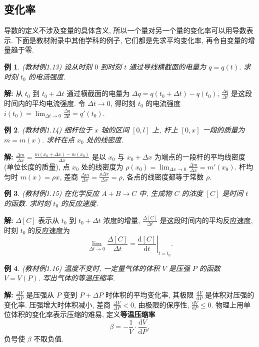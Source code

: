 \documentclass[UTF8,openany]{ctexbook}
\theoremstyle{chinesetextbook}
\newtheorem{example}{例}[section]
\newenvironment{cnsolution}{\par\indent\textbf{解:} \ignorespaces}{\par}
\newcommand{\dd}{\mathrm d}
\begin{document}
\subsection{变化率}
导数的定义不涉及变量的具体含义, 所以一个量对另一个量的变化率可以用导数表示. 下面是教材附录中其他学科的例子, 它们都是先求平均变化率, 再令自变量的增量趋于零.
\begin{example}\label{ex:c2-1-13}
\textnormal{(教材例1.13)} 设从时刻 $0$ 到时刻 $t$ 通过导线横截面的电量为 $q=q(t)$. 求时刻 $t_0$ 的电流强度.
\end{example}
\begin{cnsolution}
从 $t_0$ 到 $t_0+\Delta t$ 通过横截面的电量为 $\Delta q=q(t_0+\Delta t)-q(t_0)$, $\displaystyle\frac{\Delta q}{\Delta t}$ 是这段时间内的平均电流强度. 令 $\Delta t\to0$, 得时刻 $t_0$ 的电流强度 $\displaystyle i(t_0)=\lim_{\Delta t\to0}\frac{\Delta q}{\Delta t}=q'(t_0)$.
\end{cnsolution}
\begin{example}\label{ex:c2-1-14}
\textnormal{(教材例1.14)} 细杆位于 $x$ 轴的区间 $[0,l]$ 上, 杆上 $[0,x]$ 一段的质量为 $m=m(x)$. 求杆在点 $x_0$ 处的线密度.
\end{example}
\begin{cnsolution}
$\displaystyle\frac{\Delta m}{\Delta x}=\frac{m(x_0+\Delta x)-m(x_0)}{\Delta x}$ 是以 $x_0$ 与 $x_0+\Delta x$ 为端点的一段杆的平均线密度 (单位长度的质量), 点 $x_0$ 处的线密度为 $\displaystyle\rho(x_0)=\lim_{\Delta x\to0}\frac{\Delta m}{\Delta x}=m'(x_0)$. 杆均匀时 $m(x)=\rho x$, 差商 $\displaystyle\frac{\Delta m}{\Delta x}=\frac{\rho\Delta x}{\Delta x}=\rho$, 各点的线密度都等于常数 $\rho$.
\end{cnsolution}
\begin{example}\label{ex:c2-1-15}
\textnormal{(教材例1.15)} 在化学反应 $A+B\to C$ 中, 生成物 $C$ 的浓度 $[C]$ 是时间 $t$ 的函数. 求时刻 $t_0$ 的反应速度.
\end{example}
\begin{cnsolution}
$\Delta[C]$ 表示从 $t_0$ 到 $t_0+\Delta t$ 浓度的增量, $\displaystyle\frac{\Delta[C]}{\Delta t}$ 是这段时间内的平均反应速度, 时刻 $t_0$ 的反应速度为
\[
\lim_{\Delta t\to0}\frac{\Delta[C]}{\Delta t}=\left.\frac{\dd[C]}{\dd t}\right|_{t=t_0}.
\]
\end{cnsolution}
\begin{example}\label{ex:c2-1-16}
\textnormal{(教材例1.16)} 温度不变时, 一定量气体的体积 $V$ 是压强 $P$ 的函数 $V=V(P)$. 写出气体的等温压缩率.
\end{example}
\begin{cnsolution}
$\displaystyle\frac{\Delta V}{\Delta P}$ 是压强从 $P$ 变到 $P+\Delta P$ 时体积的平均变化率, 其极限 $\displaystyle\frac{\dd V}{\dd P}$ 是体积对压强的变化率. 压强增大时体积减小, 差商 $\displaystyle\frac{\Delta V}{\Delta P}<0$, 由极限的保序性, $\displaystyle\frac{\dd V}{\dd P}\le0$. 物理上用单位体积的变化率表示压缩的难易, 定义\textbf{等温压缩率}
\[
\beta=-\frac1V\cdot\frac{\dd V}{\dd P},
\]
负号使 $\beta$ 不取负值.
\end{cnsolution}
\end{document}
